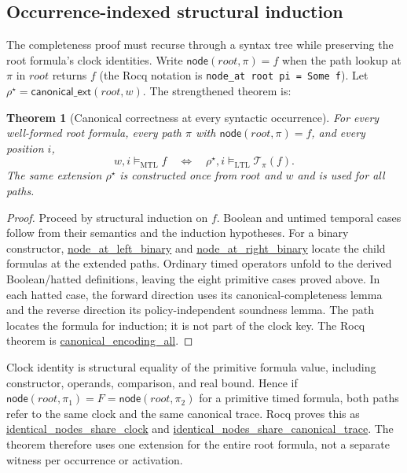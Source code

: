 \documentclass{ieeeaccess}
\newtheorem{theorem}{Theorem}[section]
\newcommand{\satM}{\models_{\mathrm{MTL}}}
\newcommand{\satL}{\models_{\mathrm{LTL}}}
\newcommand{\T}{\mathcal{T}}
\newcommand{\Rocqid}[1]{\url{#1}}
\begin{document}
\subsection{Occurrence-indexed structural induction}
\label{subsec:occurrence-induction}
The completeness proof must recurse through a syntax tree while preserving
the root formula's clock identities. Write
$\mathsf{node}(root,\pi)=f$ when the path lookup at $\pi$ in $root$
returns $f$ (the Rocq notation is
\texttt{node\_at root pi = Some f}). Let
$\rho^\star=\mathsf{canonical\_ext}(root,w)$. The strengthened theorem is:
\begin{theorem}[Canonical correctness at every syntactic occurrence]
\label{thm:canonical-all}
For every well-formed root formula, every path $\pi$ with
$\mathsf{node}(root,\pi)=f$, and every position $i$,
\[
w,i\satM f
\quad\Longleftrightarrow\quad
\rho^\star,i\satL\T_\pi(f).
\]
The same extension $\rho^\star$ is constructed once from $root$ and $w$ and
is used for all paths.
\end{theorem}
\begin{proof}
Proceed by structural induction on $f$. Boolean and untimed temporal cases
follow from their semantics and the induction hypotheses. For a binary
constructor, \Rocqid{node_at_left_binary} and
\Rocqid{node_at_right_binary} locate the child formulas at the extended
paths. Ordinary timed operators unfold to the derived Boolean/hatted
definitions, leaving the eight primitive cases proved above. In each hatted
case, the forward direction uses its canonical-completeness lemma and the
reverse direction its policy-independent soundness lemma. The path locates
the formula for induction; it is not part of the clock key. The Rocq theorem
is \Rocqid{canonical_encoding_all}.
\end{proof}

Clock identity is structural equality of the primitive formula value,
including constructor, operands, comparison, and real bound. Hence if
$\mathsf{node}(root,\pi_1)=F=\mathsf{node}(root,\pi_2)$ for a primitive
timed formula, both paths refer to the same clock and the same canonical
trace. Rocq proves this as \Rocqid{identical_nodes_share_clock} and
\Rocqid{identical_nodes_share_canonical_trace}. The theorem therefore
uses one extension for the entire root formula, not a separate witness per
occurrence or activation.
\end{document}
